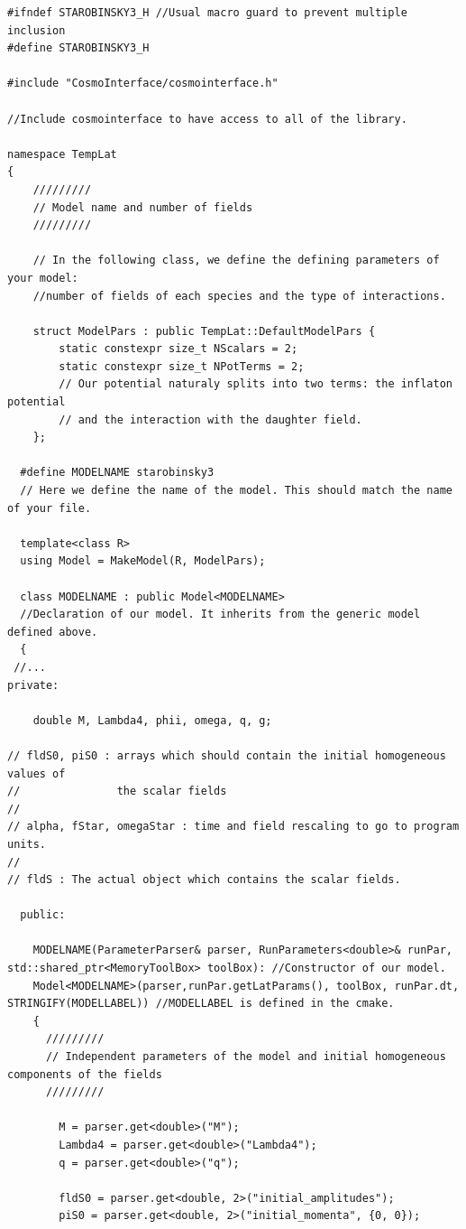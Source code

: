 \begin{lstlisting}[style = cppStyle]
#ifndef STAROBINSKY3_H //Usual macro guard to prevent multiple inclusion
#define STAROBINSKY3_H

#include "CosmoInterface/cosmointerface.h"

//Include cosmointerface to have access to all of the library.

namespace TempLat
{
    /////////
    // Model name and number of fields
    /////////

    // In the following class, we define the defining parameters of your model:
    //number of fields of each species and the type of interactions.

    struct ModelPars : public TempLat::DefaultModelPars {
        static constexpr size_t NScalars = 2;
        static constexpr size_t NPotTerms = 2;
        // Our potential naturaly splits into two terms: the inflaton potential
        // and the interaction with the daughter field.
    };

  #define MODELNAME starobinsky3
  // Here we define the name of the model. This should match the name of your file.

  template<class R>
  using Model = MakeModel(R, ModelPars);

  class MODELNAME : public Model<MODELNAME>
  //Declaration of our model. It inherits from the generic model defined above.
  {
 //...
private:

	double M, Lambda4, phii, omega, q, g;

// fldS0, piS0 : arrays which should contain the initial homogeneous values of
//               the scalar fields
//
// alpha, fStar, omegaStar : time and field rescaling to go to program units.
//
// fldS : The actual object which contains the scalar fields.
  
  public:

    MODELNAME(ParameterParser& parser, RunParameters<double>& runPar, std::shared_ptr<MemoryToolBox> toolBox): //Constructor of our model.
    Model<MODELNAME>(parser,runPar.getLatParams(), toolBox, runPar.dt, STRINGIFY(MODELLABEL)) //MODELLABEL is defined in the cmake.
    {
      /////////
      // Independent parameters of the model and initial homogeneous components of the fields
      /////////
      
        M = parser.get<double>("M");
        Lambda4 = parser.get<double>("Lambda4");
        q = parser.get<double>("q");
        
        fldS0 = parser.get<double, 2>("initial_amplitudes");
        piS0 = parser.get<double, 2>("initial_momenta", {0, 0});
        

\end{lstlisting}
